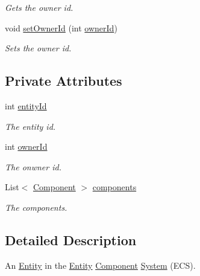 \begin{DoxyCompactItemize}
\begin{DoxyCompactList}\small\item\em Gets the owner id. \end{DoxyCompactList}\item 
void \hyperlink{classbr_1_1unb_1_1unbomber_1_1core_1_1_entity_a89e701f01f69f98550e2a66d2f3cc092}{set\+Owner\+Id} (int \hyperlink{classbr_1_1unb_1_1unbomber_1_1core_1_1_entity_a020f4ce97134330e74a1263c6335d017}{owner\+Id})
\begin{DoxyCompactList}\small\item\em Sets the owner id. \end{DoxyCompactList}\end{DoxyCompactItemize}
\subsection*{Private Attributes}
\begin{DoxyCompactItemize}
\item 
int \hyperlink{classbr_1_1unb_1_1unbomber_1_1core_1_1_entity_aa5df23ec02ab11ec73f5e9a66dc682c8}{entity\+Id}
\begin{DoxyCompactList}\small\item\em The entity id. \end{DoxyCompactList}\item 
int \hyperlink{classbr_1_1unb_1_1unbomber_1_1core_1_1_entity_a020f4ce97134330e74a1263c6335d017}{owner\+Id}
\begin{DoxyCompactList}\small\item\em The onwner id. \end{DoxyCompactList}\item 
List$<$ \hyperlink{classbr_1_1unb_1_1unbomber_1_1core_1_1_component}{Component} $>$ \hyperlink{classbr_1_1unb_1_1unbomber_1_1core_1_1_entity_a279d8487cde874b41f41b92cc7820f33}{components}
\begin{DoxyCompactList}\small\item\em The components. \end{DoxyCompactList}\end{DoxyCompactItemize}


\subsection{Detailed Description}
An \hyperlink{classbr_1_1unb_1_1unbomber_1_1core_1_1_entity}{Entity} in the \hyperlink{classbr_1_1unb_1_1unbomber_1_1core_1_1_entity}{Entity} \hyperlink{classbr_1_1unb_1_1unbomber_1_1core_1_1_component}{Component} \hyperlink{interfacebr_1_1unb_1_1unbomber_1_1core_1_1_system}{System} (E\+C\+S). 

